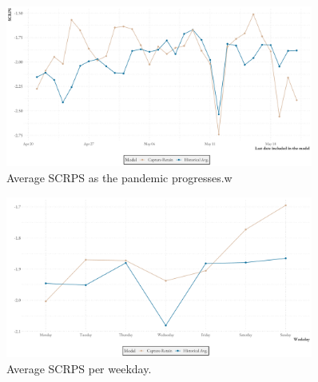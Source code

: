 \begin{figure}
    \centering
    \includegraphics[width=0.9\textwidth]{../plots/SCRPS_over_states}
    \caption{Average SCRPS as the pandemic progresses.w}
    \label{fig:SCRPS_states}
\end{figure}

\begin{figure}
    \centering
    \includegraphics[width=0.9\textwidth]{../plots/SCRPS_over_weekdays}
    \caption{Average SCRPS per weekday.}
    \label{fig:SCRPS_weekdays}
\end{figure}